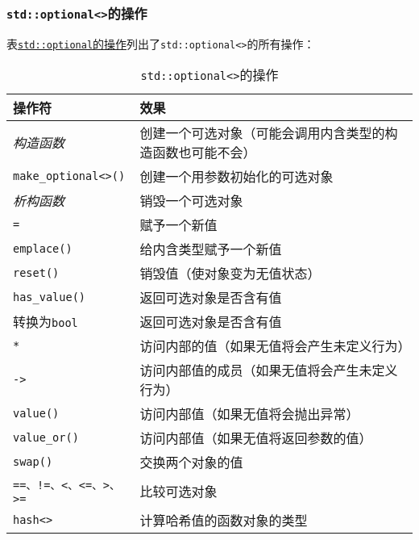 \subsubsection{\texttt{std::optional<>}的操作}
表\hyperref[t15.1]{\texttt{std::optional}的操作}列出了\texttt{std::optional<>}的所有操作：\\
\begin{table}[ht]
    \begin{tabular}{l|p{}}
        \hline
        \textbf{操作符}                & \textbf{效果}                   \\
        \hline
        \emph{构造函数}                 & 创建一个可选对象（可能会调用内含类型的构造函数也可能不会） \\
        \texttt{make\_optional<>()} & 创建一个用参数初始化的可选对象               \\
        \emph{析构函数}                 & 销毁一个可选对象                      \\
        \texttt{=}                  & 赋予一个新值                        \\
        \texttt{emplace()}          & 给内含类型赋予一个新值                   \\
        \texttt{reset()}            & 销毁值（使对象变为无值状态）                \\
        \texttt{has\_value()}       & 返回可选对象是否含有值                   \\
        转换为\texttt{bool}            & 返回可选对象是否含有值                   \\
        \texttt{*}                  & 访问内部的值（如果无值将会产生未定义行为）         \\
        \texttt{->}                 & 访问内部值的成员（如果无值将会产生未定义行为）       \\
        \texttt{value()}            & 访问内部值（如果无值将会抛出异常）             \\
        \texttt{value\_or()}        & 访问内部值（如果无值将返回参数的值）            \\
        \texttt{swap()}             & 交换两个对象的值                      \\
        \texttt{==、!=、<、<=、>、>=}    & 比较可选对象                        \\
        \texttt{hash<>}             & 计算哈希值的函数对象的类型                 \\
        \hline
    \end{tabular}
    \caption{\texttt{std::optional<>}的操作}
    \label{t15.1}
\end{table}

